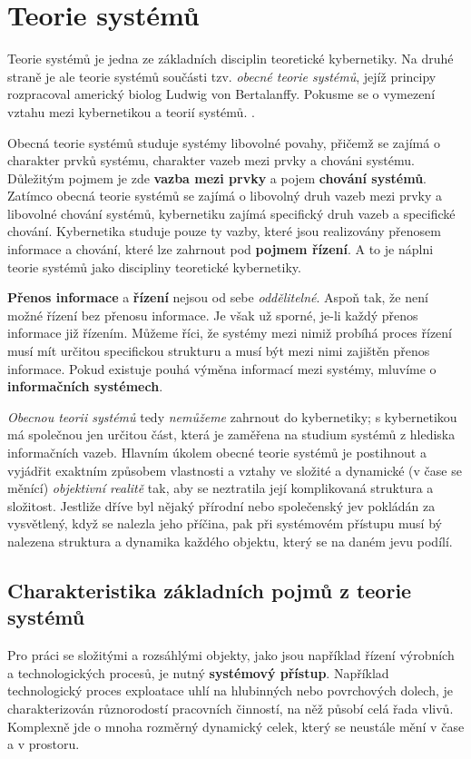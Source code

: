   \section{Teorie systémů}
     Teorie systémů je jedna ze základních disciplin teoretické kybernetiky. Na druhé straně je ale 
     teorie systémů součásti tzv. \emph{obecné teorie systémů}, jejíž principy rozpracoval americký 
     biolog Ludwig von Bertalanffy. Pokusme se o vymezení vztahu mezi kybernetikou a teorií systémů.
     \cite[s.~11]{Svarc1986}.
     
     Obecná teorie systémů studuje systémy libovolné povahy, přičemž se zajímá o charakter prvků 
     systému, charakter vazeb mezi prvky a chováni systému. Důležitým pojmem je zde \textbf{vazba 
     mezi prvky} a pojem \textbf{chování systémů}. Zatímco obecná teorie systémů se zajímá o 
     libovolný druh vazeb mezi prvky a libovolné chování systémů, kybernetiku zajímá specifický 
     druh vazeb a specifické chování. Kybernetika studuje pouze ty vazby, které jsou realizovány 
     přenosem informace a chování, které lze zahrnout pod \textbf{pojmem řízení}. A to je náplni 
     teorie systémů jako discipliny teoretické kybernetiky.
     
     \textbf{Přenos informace} a \textbf{řízení} nejsou od sebe \emph{oddělitelné}. Aspoň tak, že 
     není možné řízení bez přenosu informace. Je však už sporné, je-li každý přenos informace již 
     řízením. Můžeme říci, že systémy mezi nimiž probíhá proces řízení musí mít určitou specifickou 
     strukturu a musí být mezi nimi zajištěn přenos informace. Pokud existuje pouhá výměna 
     informací mezi systémy, mluvíme o \textbf{informačních systémech}.
     
     \emph{Obecnou teorii systémů} tedy \emph{nemůžeme} zahrnout do kybernetiky; s kybernetikou má 
     společnou jen určitou část, která je zaměřena na studium systémů z hlediska informačních 
     vazeb. Hlavním úkolem obecné teorie systémů je postihnout a vyjádřit exaktním způsobem 
     vlastnosti a vztahy ve složité a dynamické (v čase se měnící) \emph{objektivní realitě} tak, 
     aby se neztratila její komplikovaná struktura a složitost. Jestliže dříve byl nějaký přírodní 
     nebo společenský jev pokládán za vysvětlený, když se nalezla jeho příčina, pak při systémovém 
     přístupu musí bý nalezena struktura a dynamika každého objektu, který se na daném jevu podílí.
     
     \subsection{Charakteristika základních pojmů z teorie systémů}
       Pro práci se složitými a rozsáhlými objekty, jako jsou například řízení výrobních a
       technologických procesů, je nutný \textbf{systémový přístup}. Například technologický proces
       exploatace uhlí na hlubinných nebo povrchových dolech, je charakterizován různorodostí
       pracovních činností, na něž působí celá řada vlivů. Komplexně jde o mnoha rozměrný
       dynamický celek, který se neustále mění v čase a v prostoru.
       
